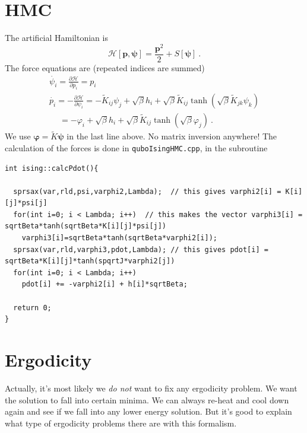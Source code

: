 \documentclass[11pt]{article}
\begin{document}
\section{HMC}
The artificial Hamiltonian is
\begin{equation}
\mathcal{H}[\bm p,\bm \psi]=\frac{\bm p^2}{2}+S[\bm \psi]\ .
\end{equation}
The force equations are (repeated indices are summed)
\begin{equation}
\begin{array}{l}
{\dot{\psi_i}=\frac{\partial \mathcal{H}}{\partial p_i}=p_i} \\
{\dot{p_i}=-\frac{\partial \mathcal{H}}{\partial\psi_i}=-\tilde{K}_{ij} \psi_j+\sqrt{\beta}h_i+\sqrt{\beta} \tilde{K}_{ij} \tanh (\sqrt{\beta} \tilde{K}_{jk} \psi_k)}\\
{\quad\ =-\varphi_i+\sqrt{\beta}h_i+\sqrt{\beta} \tilde{K}_{ij} \tanh (\sqrt{\beta} \varphi_j)}\ .
\end{array}
\end{equation}
We use $\bm \varphi=\tilde K\bm \psi$ in the last line above. No matrix inversion anywhere!   The calculation of the forces is done in \texttt{quboIsingHMC.cpp}, in the subroutine
{\tiny
\begin{lstlisting}
int ising::calcPdot(){

  sprsax(var,rld,psi,varphi2,Lambda);  // this gives varphi2[i] = K[i][j]*psi[j]
  for(int i=0; i < Lambda; i++)  // this makes the vector varphi3[i] = sqrtBeta*tanh(sqrtBeta*K[i][j]*psi[j])
    varphi3[i]=sqrtBeta*tanh(sqrtBeta*varphi2[i]);
  sprsax(var,rld,varphi3,pdot,Lambda); // this gives pdot[i] = sqrtBeta*K[i][j]*tanh(spqrtJ*varphi2[j])
  for(int i=0; i < Lambda; i++)
    pdot[i] += -varphi2[i] + h[i]*sqrtBeta;

  return 0;
}
\end{lstlisting}
}

\section{Ergodicity}
Actually, it's most likely we \emph{do not} want to fix any ergodicity problem.  We want the solution to fall into certain minima.  We can always re-heat and cool down again and see if we fall into any lower energy solution.  But it's good to explain what type of ergodicity problems there are with this formalism. 
\end{document}
